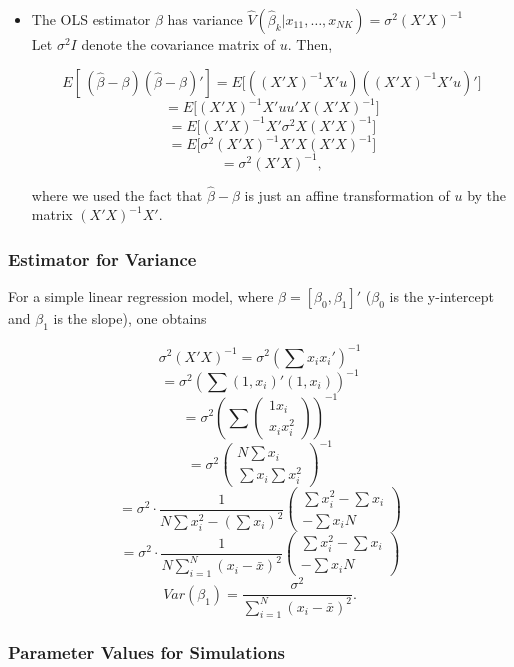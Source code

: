\documentclass[a4paper,12pt]{article}
\begin{document}
\begin{itemize}
\item The OLS estimator $\beta$ has variance $\widehat{V}(\hat{\beta}_k|x_{11},\ldots,x_{NK}) = \sigma^2 (X'X)^{-1}$ \\
Let $\sigma^2 I$ denote the covariance matrix of $u$. Then,

$$E[\,(\hat\beta - \beta)(\hat\beta - \beta)'] = E\Big[ ((X'X)^{-1}X'u)((X'X)^{-1}X'u)' \Big] $$
$$= E\Big[ (X'X)^{-1}X'uu'X(X'X)^{-1} \Big] $$
$$= E\Big[ (X'X)^{-1}X'\sigma^2X(X'X)^{-1} \Big] $$
$$= E\Big[ \sigma^2(X'X)^{-1}X'X(X'X)^{-1} \Big] $$
$$= \sigma^2 (X'X)^{-1}, $$

where we used the fact that $\hat{\beta} - \beta $ is just an affine transformation of $u$ by the matrix $(X'X)^{-1}X'$.


\end{itemize}


\subsubsection*{Estimator for Variance}


For a simple linear regression model, where $\beta = [\beta_0,\beta_1]'$ ($\beta_0$ is the y-intercept and $\beta_1$ is the slope), one obtains

$$\sigma^2 (X'X)^{-1} =  \sigma^2 \left(\sum x_ix_i'\right)^{-1}$$
$$=  \sigma^2 \left(\sum (1,x_i)' (1,x_i) \right)^{-1}$$
$$=  \sigma^2 \left(\sum \begin{pmatrix} 1 x_i\\x_i x_i^2\end{pmatrix} \right)^{-1}$$
$$=  \sigma^2 \begin{pmatrix} N \sum x_i\\\sum x_i \sum x_i^2\end{pmatrix}^{-1}$$
$$=  \sigma^2 \cdot \frac{1}{N\sum x_i^2-(\sum x_i)^2}\begin{pmatrix} \sum x_i^2 -\sum x_i\\-\sum x_i N\end{pmatrix}$$
$$=  \sigma^2 \cdot \frac{1}{N\sum_{i=1}^N{(x_i - \bar{x})^2}}\begin{pmatrix} \sum x_i^2 -\sum x_i\\-\sum x_i N\end{pmatrix}$$
$$Var(\beta_1) = \frac{\sigma^2}{\sum_{i=1}^N{(x_i - \bar{x})^2}}.$$




\subsubsection*{Parameter Values for Simulations}
\end{document}
